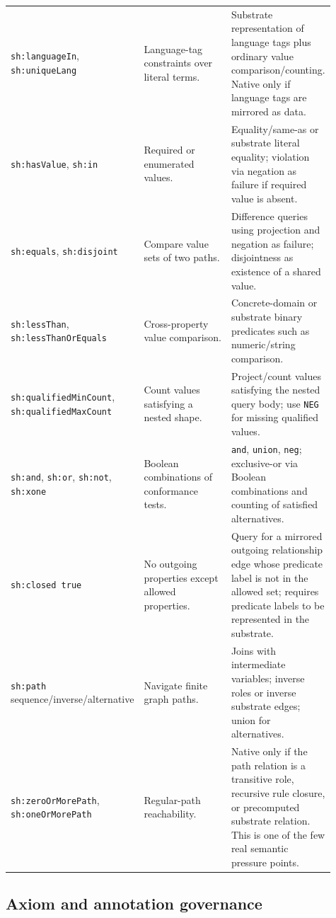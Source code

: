 \documentclass[11pt,letterpaper]{article}
\newcommand{\naf}{negation as failure}
\begin{document}
\begin{longtable}{p{0.25\linewidth}p{0.34\linewidth}p{0.32\linewidth}}
\addlinespace
\texttt{sh:languageIn}, \texttt{sh:uniqueLang} & Language-tag constraints over literal terms. & Substrate representation of language tags plus ordinary value comparison/counting. Native only if language tags are mirrored as data. \\
\addlinespace
\texttt{sh:hasValue}, \texttt{sh:in} & Required or enumerated values. & Equality/same-as or substrate literal equality; violation via \naf{} if required value is absent. \\
\addlinespace
\texttt{sh:equals}, \texttt{sh:disjoint} & Compare value sets of two paths. & Difference queries using projection and \naf{}; disjointness as existence of a shared value. \\
\addlinespace
\texttt{sh:lessThan}, \texttt{sh:lessThanOrEquals} & Cross-property value comparison. & Concrete-domain or substrate binary predicates such as numeric/string comparison. \\
\addlinespace
\texttt{sh:qualifiedMinCount}, \texttt{sh:qualifiedMaxCount} & Count values satisfying a nested shape. & Project/count values satisfying the nested query body; use \texttt{NEG} for missing qualified values. \\
\addlinespace
\texttt{sh:and}, \texttt{sh:or}, \texttt{sh:not}, \texttt{sh:xone} & Boolean combinations of conformance tests. & \texttt{and}, \texttt{union}, \texttt{neg}; exclusive-or via Boolean combinations and counting of satisfied alternatives. \\
\addlinespace
\texttt{sh:closed true} & No outgoing properties except allowed properties. & Query for a mirrored outgoing relationship edge whose predicate label is not in the allowed set; requires predicate labels to be represented in the substrate. \\
\addlinespace
\texttt{sh:path} sequence/inverse/alternative & Navigate finite graph paths. & Joins with intermediate variables; inverse roles or inverse substrate edges; union for alternatives. \\
\addlinespace
\texttt{sh:zeroOrMorePath}, \texttt{sh:oneOrMorePath} & Regular-path reachability. & Native only if the path relation is a transitive role, recursive rule closure, or precomputed substrate relation. This is one of the few real semantic pressure points. \\
\end{longtable}

\subsection{Axiom and annotation governance}
\end{document}
